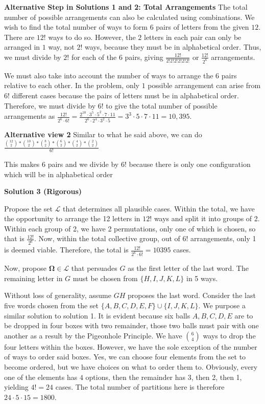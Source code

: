 \begin{enumerate}
 \textbf{Alternative Step in Solutions 1 and 2: Total Arrangements} The total number of possible arrangements can also be calculated using combinations. We wish to find the total number of ways to form $6$ pairs of letters from the given $12$. There are $12!$ ways to do so. However, the $2$ letters in each pair can only be arranged in $1$ way, not $2!$ ways, because they must be in alphabetical order. Thus, we must divide by $2!$ for each of the $6$ pairs, giving $\frac{12!}{2!2!2!2!2!2!}$ or $\frac{12!}{2^6}$ arrangements. 

 
We must also take into account the number of ways to arrange the $6$ pairs relative to each other. In the problem, only $1$ possible arrangement can arise from $6!$ different cases because the pairs of letters must be in alphabetical order. Therefore, we must divide by $6!$ to give the total number of possible arrangements as $\frac{12!}{2^6\cdot6!}=\frac{2^{10}\cdot3^5\cdot5^2\cdot7\cdot11}{2^6\cdot2^4\cdot3^2\cdot5}=3^3\cdot5\cdot7\cdot11=10,395$.

 \textbf{Alternative view 2} Similar to what he said above, we can do $\frac{\binom{12}{2} * \binom{10}{2} * \binom{8}{2} * \binom{6}{2} * \binom{4}{2} * \binom{2}{2}}{6!}$

 This makes 6 pairs and we divide by 6! because there is only one configuration which will be in alphabetical order

 



\textbf{Solution 3 (Rigorous)}

Propose the set $\mathcal{L}$ that determines all plausible cases. Within the total, we have the opportunity to arrange the 12 letters in $12!$ ways and split it into groups of 2. Within each group of 2, we have 2 permutations, only one of which is chosen, so that is $\frac{12!}{2^6}$. Now, within the total collective group, out of $6!$ arrangements, only 1 is deemed viable. Therefore, the total is $\frac{12!}{2^6 \cdot 6!} = 10395$ cases.

 Now, propose $\mathbf{\Omega} \in \mathcal{L}$ that persuades $G$ as the first letter of the last word. The remaining letter in $G$ must be chosen from $\{H, I, J, K, L \}$ in 5 ways. 

 Without loss of generality, assume $GH$ proposes the last word. Consider the last five words chosen from the set $\{A,B,C,D,E,F \} \cup \{I,J,K,L \}$. We purpose a similar solution to solution 1. It is evident because six balls $A,B,C,D,E$ are to be dropped in four boxes with two remainder, those two balls must pair with one another as a result by the Pigeonhole Principle. We have $\binom{6}{4}$ ways to drop the four letters within the boxes. However, we have the sole exception of the number of ways to order said boxes. Yes, we can choose four elements from the set to become ordered, but we have choices on what to order them to. Obviously, every one of the elements has $4$ options, then the remainder has 3, then 2, then 1, yielding $4! = 24$ cases. The total number of partitions here is therefore $24 \cdot 5 \cdot 15 = 1800$.


\end{enumerate}
